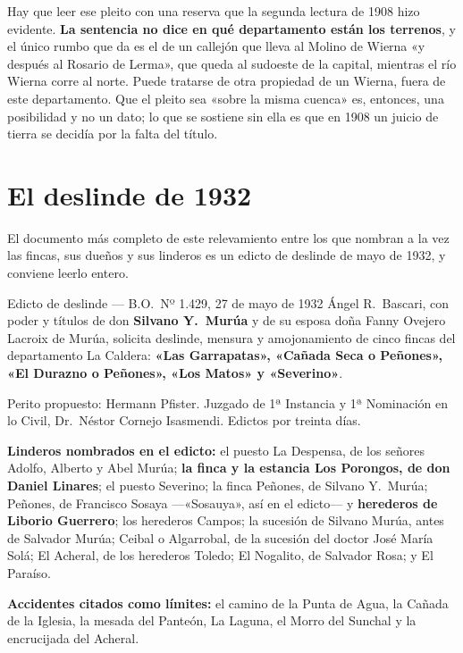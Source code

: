 \begin{cautela}
Hay que leer ese pleito con una reserva que la segunda lectura de 1908 hizo evidente. \textbf{La
sentencia no dice en qué departamento están los terrenos}, y el único rumbo que da es el de un
callejón que lleva al Molino de Wierna «y después al Rosario de Lerma», que queda al sudoeste de
la capital, mientras el río Wierna corre al norte. Puede tratarse de otra propiedad de un Wierna, fuera
de este departamento. Que el pleito sea «sobre la misma cuenca» es, entonces, una posibilidad y
no un dato; lo que se sostiene sin ella es que en 1908 un juicio de tierra se decidía por la
falta del título.
\end{cautela}

\section{El deslinde de 1932}

El documento más completo de este relevamiento entre los que nombran a la vez las fincas, sus
dueños y sus linderos es un edicto de deslinde de mayo de 1932, y conviene leerlo entero.

\begin{ficha}{Edicto de deslinde --- B.O.\ Nº 1.429, 27 de mayo de 1932}
Ángel R.\ Bascari, con poder y títulos de don \textbf{Silvano Y.\ Murúa} y de su esposa doña
Fanny Ovejero Lacroix de Murúa, solicita deslinde, mensura y amojonamiento de cinco fincas
del departamento La Caldera: \textbf{«Las Garrapatas», «Cañada Seca o Peñones», «El Durazno o
Peñones», «Los Matos» y «Severino»}.

Perito propuesto: Hermann Pfister. Juzgado de 1ª Instancia y 1ª Nominación en lo Civil, Dr.\
Néstor Cornejo Isasmendi. Edictos por treinta días.

\textbf{Linderos nombrados en el edicto:} el puesto La Despensa, de los señores Adolfo,
Alberto y Abel Murúa; \textbf{la finca y la estancia Los Porongos, de don Daniel Linares};
el puesto Severino; la finca Peñones, de Silvano Y.\ Murúa; Peñones, de Francisco Sosaya ---«Sosauya», así en el edicto--- y
\textbf{herederos de Liborio Guerrero\index{Guerrero, Liborio}}; los herederos Campos; la sucesión de Silvano Murúa,
antes de Salvador Murúa; Ceibal o Algarrobal, de la sucesión del doctor José María Solá; El
Acheral, de los herederos Toledo; El Nogalito, de Salvador Rosa; y El Paraíso.

\textbf{Accidentes citados como límites:} el camino de la Punta de Agua, la Cañada de la
Iglesia, la mesada del Panteón, La Laguna, el Morro del Sunchal y la encrucijada del
Acheral.
\end{ficha}

